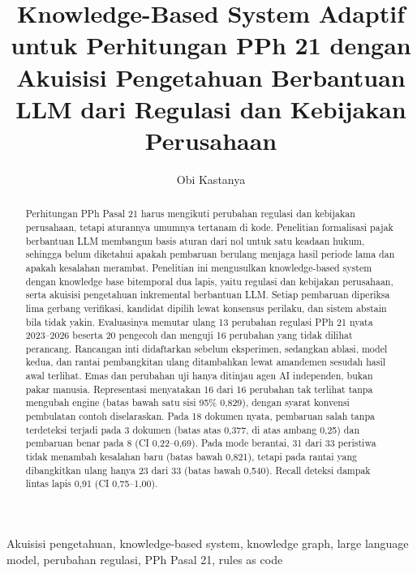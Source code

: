 \documentclass[journal,a4paper]{IEEEtran}
\makeatletter
\DeclareRobustCommand{\en}[1]{{\usefont{\f@encoding}{\f@family}{\f@series}{it}#1\/}}
\makeatother
\begin{document}
\title{\en{Knowledge-Based System} Adaptif untuk Perhitungan PPh 21 dengan Akuisisi Pengetahuan Berbantuan LLM dari Regulasi dan Kebijakan Perusahaan}
\author{Obi Kastanya}
\maketitle

\begin{abstract}
Perhitungan PPh Pasal 21 harus mengikuti perubahan regulasi dan kebijakan perusahaan, tetapi aturannya umumnya tertanam di kode. Penelitian formalisasi pajak berbantuan LLM membangun basis aturan dari nol untuk satu keadaan hukum, sehingga belum diketahui apakah pembaruan berulang menjaga hasil periode lama dan apakah kesalahan merambat. Penelitian ini mengusulkan \en{knowledge-based system} dengan \en{knowledge base} bitemporal dua lapis, yaitu regulasi dan kebijakan perusahaan, serta akuisisi pengetahuan inkremental berbantuan LLM. Setiap pembaruan diperiksa lima gerbang verifikasi, kandidat dipilih lewat konsensus perilaku, dan sistem \en{abstain} bila tidak yakin. Evaluasinya memutar ulang 13 perubahan regulasi PPh 21 nyata 2023--2026 beserta 20 pengecoh dan menguji 16 perubahan yang tidak dilihat perancang. Rancangan inti didaftarkan sebelum eksperimen, sedangkan ablasi, model kedua, dan rantai pembangkitan ulang ditambahkan lewat amandemen sesudah hasil awal terlihat. Emas dan perubahan uji hanya ditinjau agen AI independen, bukan pakar manusia. Representasi menyatakan 16 dari 16 perubahan tak terlihat tanpa mengubah \en{engine} (batas bawah satu sisi 95\% 0,829), dengan syarat konvensi pembulatan contoh diselaraskan. Pada 18 dokumen nyata, pembaruan salah tanpa terdeteksi terjadi pada 3 dokumen (batas atas 0,377, di atas ambang 0,25) dan pembaruan benar pada 8 (CI 0,22--0,69). Pada mode berantai, 31 dari 33 peristiwa tidak menambah kesalahan baru (batas bawah 0,821), tetapi pada rantai yang dibangkitkan ulang hanya 23 dari 33 (batas bawah 0,540). \en{Recall} deteksi dampak lintas lapis 0,91 (CI 0,75--1,00).
\end{abstract}

\begin{IEEEkeywords}
Akuisisi pengetahuan, \en{knowledge-based system}, \en{knowledge graph}, \en{large language model}, perubahan regulasi, PPh Pasal 21, \en{rules as code}
\end{IEEEkeywords}

\end{document}
